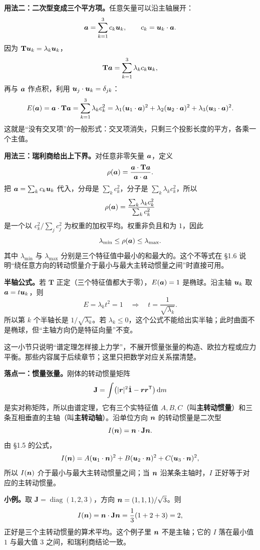 \documentclass[11pt]{ctexart}
\newcommand{\ten}[1]{\mathbf{#1}}
\newcommand{\unitd}{\hat{\ten{1}}}
\let\origsubhdr\subhdr
\renewcommand{\subhdr}[1]{\par\needspace{3\baselineskip}\origsubhdr{#1}}
\begin{document}
\textbf{用法二：二次型变成三个平方项。}任意矢量可以沿主轴展开：
\[
\boldsymbol{a}=\sum_{k=1}^{3}c_k\boldsymbol{u}_k,
\qquad
c_k=\boldsymbol{u}_k\cdot\boldsymbol{a} .
\]
因为 $\ten T\vect u_k=\lambda_k\vect u_k$，
\[
\ten T\vect a=\sum_{k=1}^{3}\lambda_k c_k\vect u_k,
\]
再与 $\boldsymbol{a}$ 作点积，利用 $\boldsymbol{u}_j\cdot\boldsymbol{u}_k=\delta_{jk}$：
\[
E(\vect a)=\vect a\cdot\ten T\vect a
=\sum_{k=1}^{3}\lambda_k c_k^2
=\lambda_1(\vect u_1\cdot\vect a)^2
+\lambda_2(\vect u_2\cdot\vect a)^2
+\lambda_3(\vect u_3\cdot\vect a)^2 .
\]
这就是“没有交叉项”的一般形式：交叉项消失，只剩三个投影长度的平方，各乘一个主值。

\textbf{用法三：瑞利商给出上下界。}对任意非零矢量 $\boldsymbol{a}$，定义
\[
\rho(\vect a)=\frac{\vect a\cdot\ten T\vect a}{\vect a\cdot\vect a}.
\]
把 $\boldsymbol{a}=\sum_k c_k\boldsymbol{u}_k$ 代入，分母是 $\sum_k c_k^2$，分子是 $\sum_k\lambda_k c_k^2$，所以
\[
\rho(\boldsymbol{a})
=\frac{\sum_k\lambda_k c_k^2}{\sum_k c_k^2}
\]
是一个以 $c_k^2/\sum_j c_j^2$ 为权重的加权平均。权重非负且和为 $1$，因此
\[
\lambda_{\min}\le\rho(\boldsymbol{a})\le\lambda_{\max}.
\]
其中 $\lambda_{\min}$ 与 $\lambda_{\max}$ 分别是三个特征值中最小的和最大的。这个不等式在 §1.6 说明“绕任意方向的转动惯量介于最小与最大主转动惯量之间”时直接可用。

\textbf{半轴公式。}若 $\ten T$ 正定（三个特征值都大于零），$E(\boldsymbol{a})=1$ 是椭球。沿主轴 $\boldsymbol{u}_k$ 取 $\boldsymbol{a}=t\boldsymbol{u}_k$，则
\[
E=\lambda_k t^2=1
\quad\Longrightarrow\quad
t=\frac{1}{\sqrt{\lambda_k}} .
\]
所以第 $k$ 个半轴长是 $1/\sqrt{\lambda_k}$。若 $\lambda_k\le0$，这个公式不能给出实半轴；此时曲面不是椭球，但“主轴方向仍是特征向量”不变。


这一小节只说明“谱定理怎样接上力学”，不展开惯量张量的构造、欧拉方程或应力平衡。那些内容属于后续章节；这里只把数学对应关系摆清楚。

\textbf{落点一：惯量张量。}刚体的转动惯量矩阵
\[
\ten J=\int\bigl(|\vect r|^2\unitd-\vect r\vect r^{\mathsf T}\bigr)\dd m
\]
是实对称矩阵，所以由谱定理，它有三个实特征值 $A,B,C$（叫\textbf{主转动惯量}）和三条互相垂直的主轴（叫\textbf{主转动轴}）。沿单位方向 $\boldsymbol{n}$ 的转动惯量是二次型
\[
I(\vect n)=\vect n\cdot\ten J\vect n .
\]
由 §1.5 的公式，
\[
I(\boldsymbol{n})=A(\boldsymbol{u}_1\cdot\boldsymbol{n})^2
+B(\boldsymbol{u}_2\cdot\boldsymbol{n})^2
+C(\boldsymbol{u}_3\cdot\boldsymbol{n})^2,
\]
所以 $I(\boldsymbol{n})$ 介于最小与最大主转动惯量之间；当 $\boldsymbol{n}$ 沿某条主轴时，$I$ 正好等于对应的主转动惯量。

\textbf{小例。}取 $\ten J=\operatorname{diag}(1,2,3)$，方向 $\boldsymbol{n}=(1,1,1)/\sqrt3$。则
\[
I(\vect n)=\vect n\cdot\ten J\vect n
=\frac{1}{3}(1+2+3)=2,
\]
正好是三个主转动惯量的算术平均。这个例子里 $\boldsymbol{n}$ 不是主轴；它的 $I$ 落在最小值 $1$ 与最大值 $3$ 之间，和瑞利商结论一致。
\end{document}
